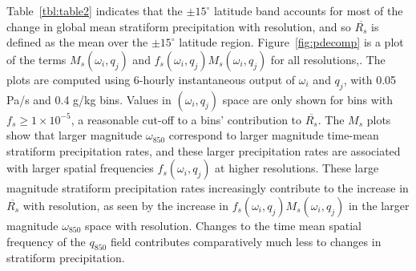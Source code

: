 \documentclass[times]{qjrms4}
\begin{document}
Table~\ref{tbl:table2} indicates that the $\pm 15^{\circ}$ latitude band accounts for most of the change in global mean stratiform precipitation with resolution, and so $\overline{R_s}$ is defined as the mean over the $\pm 15^{\circ}$ latitude region. Figure~\ref{fig:pdecomp} is a plot of the terms $M_s \left( \omega_i , q_j \right)$ and $f_s \left( \omega_i , q_j \right) M_s \left( \omega_i , q_j \right)$ for all resolutions,. The plots are computed using 6-hourly instantaneous output of $\omega_{i}$ and $q_{j}$, with 0.05 Pa/s and 0.4 g/kg bins. Values in  $\left( \omega_{i} , q_{j} \right)$ space are only shown for bins with $f_s \geq1 \times 10^{-5}$, a reasonable cut-off to a bins' contribution to $\overline{R_s}$. The $M_s$ plots show that larger magnitude $\omega_{850}$ correspond to larger magnitude time-mean stratiform precipitation rates, and these larger precipitation rates are associated with larger spatial frequencies $f_s \left( \omega_i , q_j \right)$ at higher resolutions. These large magnitude stratiform precipitation rates increasingly contribute to the increase in $\overline{R_{s}}$ with resolution, as seen by the increase in $f_s \left( \omega_i , q_j \right) M_s \left( \omega_i , q_j \right)$ in the larger magnitude $\omega_{850}$ space with resolution. Changes to the time mean spatial frequency of the $q_{850}$ field contributes comparatively much less to changes in stratiform precipitation.
\end{document}
